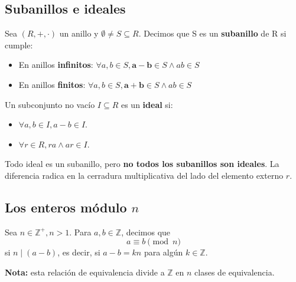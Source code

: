 \documentclass[12pt]{article}
\begin{document}
\newpage

\subsection*{Subanillos e ideales}

\begin{tcolorbox}[title=Subanillo]
Sea \( (R, +, \cdot) \) un anillo y \( \emptyset \neq S \subseteq R \). Decimos que S es un \textbf{subanillo} de R si cumple:
\begin{itemize}
    \item En anillos \textbf{infinitos}: \( \forall a,b \in S, \boldsymbol{a - b} \in S \land ab \in S \)
    \item En anillos \textbf{finitos}: \( \forall a,b \in S, \boldsymbol{a + b} \in S \land ab \in S \)
\end{itemize}
\end{tcolorbox}

\begin{tcolorbox}[title=Ideales]
Un subconjunto no vacío \( I \subseteq R \) es un \textbf{ideal} si:
\begin{itemize}
    \item \( \forall a, b \in I, a - b \in I \).
    \item \( \forall r \in R, ra \land ar \in I \).
\end{itemize}
\end{tcolorbox}

\begin{tcolorbox}[colback=yellow!15, title=Importante]
Todo ideal es un subanillo, pero \textbf{no todos los subanillos son ideales}. La diferencia radica en la cerradura multiplicativa del lado del elemento externo \( r \).
\end{tcolorbox}

\newpage

\subsection*{Los enteros módulo \( n \)}

\begin{tcolorbox}[title=Congruencia modular]
Sea \( n \in \mathbb{Z}^+, n > 1 \). Para \( a, b \in \mathbb{Z} \), decimos que
\[
a \equiv b \pmod{n}
\]
si \( n \mid (a - b) \), es decir, si \( a - b = kn \) para algún \( k \in \mathbb{Z} \).

\bigskip

\textbf{Nota:} esta relación de equivalencia divide a \( \mathbb{Z} \) en \( n \) clases de equivalencia.
\end{tcolorbox}
\end{document}
